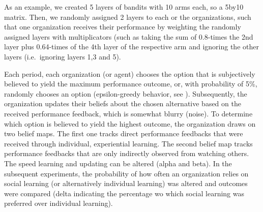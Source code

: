 As an example, we created 5 layers of bandits with 10 arms each, so a 5by10 matrix. Then, we randomly assigned 2 layers to each or the organizations, such that one organization receives their performance by weighting the randomly assigned layers with multiplicators (such as taking the sum of 0.8-times the 2nd layer plus 0.64-times of the 4th layer of the respective arm and ignoring the other layers (i.e.\, ignoring layers 1,3 and 5). 

Each period, each organization (or agent) chooses the option that is subjectively believed to yield the maximum performance outcome, or, with probability of 5\%, randomly chooses an option (epsilon-greedy behavior, see \citealt{LaveMarch1975_An-Introduction-to-Models-i}). Subsequently, the organization updates their beliefs about the chosen alternative based on the received performance feedback, which is somewhat blurry (noise).
To determine which option is believed to yield the highest outcome, the organization draws on two belief maps. The first one tracks direct performance feedbacks that were received through individual, experiential learning. The second belief map tracks performance feedbacks that are only indirectly observed from watching others. The speed learning and updating can be altered (alpha and beta).
In the subsequent experiments, the probability of how often an organization relies on social learning (or alternatively individual learning) was altered and outcomes were compared (delta indicating the percentage wo which social learning was preferred over individual learning). 



